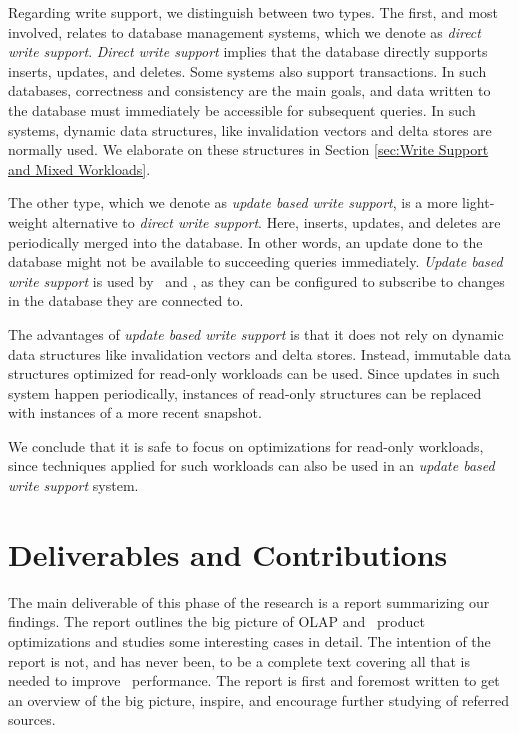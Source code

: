 Regarding write support, we distinguish between two types. The first, and most involved, relates to database management systems, which we denote as \textit{direct write support}. \textit{Direct write support} implies that the database directly supports inserts, updates, and deletes. Some systems also support transactions. In such databases, correctness and consistency are the main goals, and data written to the database must immediately be accessible for subsequent queries. In such systems, dynamic data structures, like invalidation vectors and delta stores are normally used. We elaborate on these structures in Section \ref{sec:Write Support and Mixed Workloads}.


The other type, which we denote as \textit{update based write support}, is a more light-weight alternative to \textit{direct write support}. Here, inserts, updates, and deletes are periodically merged into the database. In other words, an update done to the database might not be available to succeeding queries immediately. \textit{Update based write support} is used by \qlikview~and \tableau, as they can be configured to subscribe to changes in the database they are connected to.

The advantages of \textit{update based write support} is that it does not rely on dynamic data structures like invalidation vectors and delta stores. Instead, immutable data structures optimized for read-only workloads can be used. Since updates in such system happen periodically, instances of read-only structures can be replaced with instances of a more recent snapshot.

We conclude that it is safe to focus on optimizations for read-only workloads, since techniques applied for such workloads can also be used in an \textit{update based write support} system.



\section{Deliverables and Contributions}
\label{sec:Deliverables and Contributions}

The main deliverable of this phase of the research is a report summarizing our findings. The report outlines the big picture of OLAP and \bd~product optimizations and studies some interesting cases in detail. The intention of the report is not, and has never been, to be a complete text covering all that is needed to improve \bd~performance. The report is first and foremost written to get an overview of the big picture, inspire, and encourage further studying of referred sources. 

